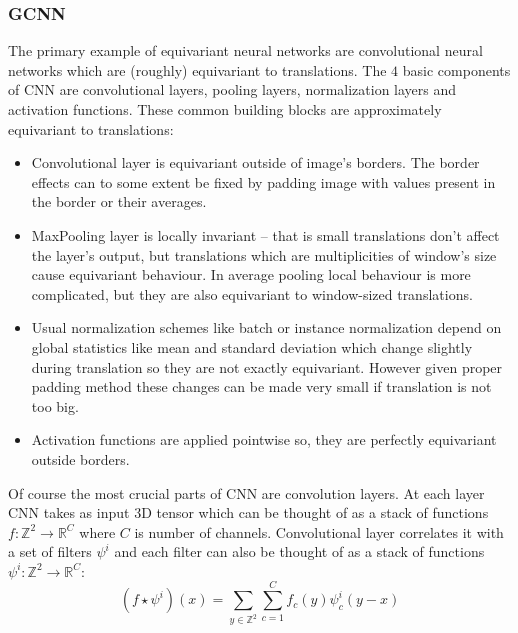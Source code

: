     \subsubsection{GCNN}
    The primary example of equivariant neural networks are convolutional neural
    networks which are (roughly) equivariant to translations. The $4$ basic
    components of CNN are convolutional layers, pooling layers, normalization
    layers and activation functions.  These common building blocks are approximately
    equivariant to translations:
    \begin{itemize}
        \item Convolutional layer is
            equivariant outside of image's borders. The border effects can to
            some extent be fixed by padding image with values present in the
            border or their averages.
        \item MaxPooling layer is locally invariant -- that is small translations don't
            affect the layer's output, but translations which are multiplicities
            of window's size cause equivariant behaviour.
            In average pooling local behaviour is more
            complicated, but they are also equivariant to window-sized
            translations.
        \item Usual normalization schemes like batch or instance
            normalization depend on global statistics
            like mean and standard deviation which change slightly during
            translation so they are not exactly equivariant. However given
            proper padding method these changes can be made very small if
            translation is not too big.
        \item Activation functions are applied pointwise so, they are
            perfectly equivariant outside borders.
    \end{itemize}
    Of course the most crucial parts of CNN are convolution layers. At each
    layer CNN takes as input 3D tensor which can be thought of as a
    stack of functions $f:\mathbb{Z}^2\to\mathbb{R}^C$ where $C$ is number of channels.
    Convolutional layer correlates it with a set of filters $\psi^i$
    and each filter can also be thought of as a stack of functions
    $\psi^i:\mathbb{Z}^2\to\mathbb{R}^C$:
    \begin{equation}
        \label{eq:cnn}
        (f\star\psi^i)(x) = \sum_{y\in\mathbb{Z}^2}\sum_{c=1}^C
        f_c(y)\psi_{c}^{i}(y-x)
    \end{equation}


